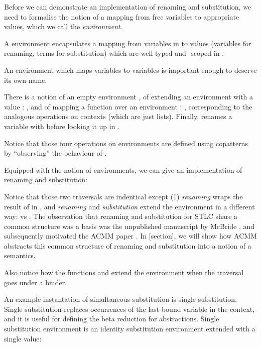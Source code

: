\documentclass[bsc,frontabs,oneside,singlespacing,parskip,deptreport]{infthesis}
\theoremstyle{definition}
\theoremstyle{lemma}
\begin{document}
Before we can demonstrate an implementation of renaming and
substitution, we need to formalise the notion of a mapping from free
variables to appropriate values, which we call the
\textit{environment}.


A environment  encapsulates a mapping from variables in
 to values  (variables for renaming, terms for
substitution) which are well-typed and -scoped in .

An environment which maps variables to variables is important enough
to deserve its own name.


There is a notion of an empty environment , of extending an
environment  with a value : , and of mapping a
function  over an environment : ,
corresponding to the analogous operations on contexts (which are just
lists). Finally,  renames a variable with 
before looking it up in .


Notice that those four operations on environments are defined using
copatterns \cite{DBLP:conf/popl/AbelPTS13} by ``observing'' the
behaviour of .

Equipped with the notion of environments, we can give an
implementation of renaming and substitution:


Notice that those two traversals are indentical except (1)
\textit{renaming} wraps the result of  in , and
\textit{renaming} and \textit{substitution} extend the environment in
a different way:  vs . The observation that renaming and substitution for STLC share a
common structure was a basis was the unpublished manuscript by McBride
\cite{mcbride2005type}, and subsequently motivated the ACMM paper
\cite{DBLP:conf/cpp/Allais0MM17}. In [section], we will show how ACMM
abstracts this common structure of renaming and substitution into a
notion of a semantics.

Also notice how the functions  and  extend the
environment when the traversal goes under a binder.

An example instantation of simultaneous substitution is single
substitution. Single substitution replaces occurrences of the
last-bound variable in the context, and it is useful for defining the
beta reduction for abstractions. Single substitution environment is an
identity substitution environment extended with a single value:
\end{document}
